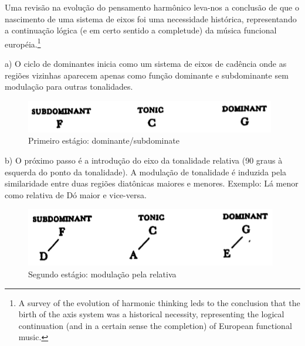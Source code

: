 \documentclass[
	12pt,				%
	openright,			%
	twoside,			%
	a4paper,			%
	english,			%
	french,				%
	spanish,			%
	brazil				%
	]{abntex2}
\begin{document}
\begin{citacao}
Uma revisão na evolução do pensamento harmônico leva-nos a conclusão de que o nascimento de uma sistema de eixos foi uma necessidade histórica, representando a continuação lógica (e em certo sentido a completude) da música funcional européia.\cite[ p.08]{lendvai1971bela}\footnote{A survey of the evolution of harmonic thinking leds to the conclusion that the birth of the axis system was a historical necessity, representing the logical continuation (and in a certain sense the completion) of European functional music.\cite[ p.08]{lendvai1971bela}}
\end{citacao}


a) O ciclo de dominantes inicia como um sistema de eixos de cadência onde as regiões vizinhas aparecem apenas como função dominante e subdominante sem modulação para outras tonalidades. 

\begin{figure}[!h]
	\caption{\label{fig_grafico}Primeiro estágio: dominante/subdominate}
	\begin{center}
	    \includegraphics[scale=0.5]{axis/estagio01.png}
	\end{center}
\end{figure}


b) O próximo passo é a introdução do eixo da tonalidade relativa (90 graus à esquerda do ponto da tonalidade). A modulação de tonalidade é induzida pela similaridade entre duas regiões diatônicas maiores e menores. Exemplo: Lá menor como relativa de Dó maior e vice-versa.

\begin{figure}[!h]
	\caption{\label{fig_grafico}Segundo estágio: modulação pela relativa}
	\begin{center}
	    \includegraphics[scale=0.5]{axis/estagio02.png}
	\end{center}
\end{figure}
\end{document}
